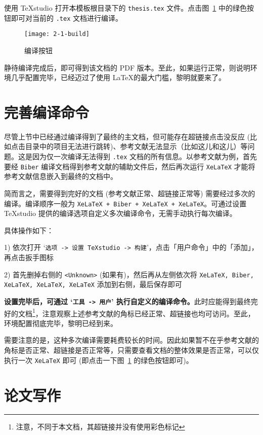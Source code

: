 使用 TeXstudio 打开本模板根目录下的 \texttt{thesis.tex} 文件。点击图~\ref{fig:build} 中的绿色按钮即可对当前的 \texttt{.tex} 文档进行编译。

\begin{figure}[htb]
    \centering
    \texttt{[image: 2-1-build]}
    \caption{\label{fig:build} 编译按钮}
\end{figure}

静待编译完成后，即可得到该文档的 PDF 版本。至此，如果运行正常，则说明环境几乎配置完毕，已经迈过了使用 \LaTeX 的最大门槛，黎明就要来了。

\section{完善编译命令}

尽管上节中已经通过编译得到了最终的主文档，但可能存在超链接点击没反应 (比如点击目录中的项目无法进行跳转)、参考文献无法显示（比如这儿\cite{lecun2015deep}和这儿\cite{krizhevsky_imagenet_2012}）等问题。这是因为仅一次编译无法得到 \texttt{.tex} 文档的所有信息。以参考文献为例，首先要经 \texttt{Biber} 编译文档得到参考文献的辅助文件后，然后再次运行 \texttt{XeLaTeX} 才能将参考文献信息嵌入到最终的文档中。

简而言之，需要得到完好的文档 (参考文献正常、超链接正常等) 需要经过多次的编译。编译顺序一般为 \texttt{XeLaTeX + Biber + XeLaTeX + XeLaTeX}。可通过设置 TeXstudio 提供的编译选项自定义多次编译命令，无需手动执行每次编译。

具体操作如下：

1) 依次打开 `\texttt{选项 -> 设置 TeXstudio -> 构建}'，点击「用户命令」中的「添加」，再点击扳手图标

2) 首先删掉右侧的 \texttt{<Unknown>} (如果有)，然后再从左侧依次将 \texttt{XeLaTeX, Biber, XeLaTeX, XeLaTeX, XeLaTeX} 添加到右侧，最后保存即可

\textbf{设置完毕后，可通过 `\texttt{工具 -> 用户}' 执行自定义的编译命令。}此时应能得到最终完好的文档\footnote{注意，不同于本文档，其超链接并没有使用彩色标记}，注意观察上述参考文献的角标已经正常、超链接也均可访问。至此，环境配置彻底完毕，黎明已经到来。

需要注意的是，这种多次编译需要耗费较长的时间。因此如果暂不在乎参考文献的角标是否正常、超链接是否正常等，只需要查看文档的整体效果是否正常，可以仅执行一次 \texttt{XeLaTeX} 即可 (即点击一下图~\ref{fig:build} 的绿色按钮即可)。

\section{论文写作}


